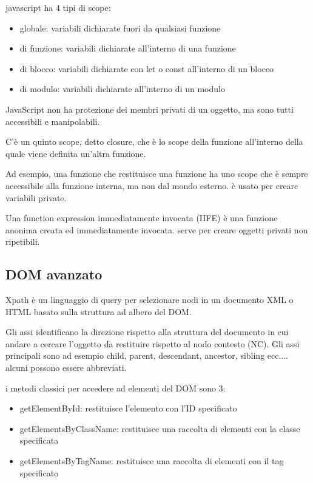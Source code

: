 \documentclass[12pt]{article}
\begin{document}
javascript ha 4 tipi di scope:
\begin{itemize}
    \item globale: variabili dichiarate fuori da qualsiasi funzione
    \item di funzione: variabili dichiarate all'interno di una funzione
    \item di blocco: variabili dichiarate con let o const all'interno di un blocco
    \item di modulo: variabili dichiarate all'interno di un modulo
    \end{itemize}

    JavaScript non ha protezione dei membri privati di un oggetto, ma sono tutti accessibili e
manipolabili.

C'è un quinto scope, detto closure, che è lo scope
della funzione all'interno della quale viene
definita un'altra funzione.

Ad esempio, una funzione che restituisce una
funzione ha uno scope che è sempre accessibile
alla funzione interna, ma non dal mondo esterno.
è usato per creare variabili private.

Una function expression immediatamente
invocata (IIFE) è una funzione anonima creata ed
immediatamente invocata. serve per creare oggetti privati non ripetibili.

\subsection{DOM avanzato}

Xpath è un linguaggio di query per selezionare nodi in un documento XML o HTML basato sulla struttura ad albero del DOM.

Gli assi identificano la direzione rispetto alla struttura del
documento in cui andare a cercare l'oggetto da restituire rispetto
al nodo contesto (NC).
Gli assi principali sono ad esempio child, parent, descendant, ancestor, sibling ecc....
alcuni possono essere abbreviati.

i metodi classici per accedere ad elementi del DOM sono 3:
\begin{itemize}
    \item getElementById: restituisce l'elemento con l'ID specificato
    \item getElementsByClassName: restituisce una raccolta di elementi con la classe specificata
    \item getElementsByTagName: restituisce una raccolta di elementi con il tag specificato
    \end{itemize}   
\end{document}
